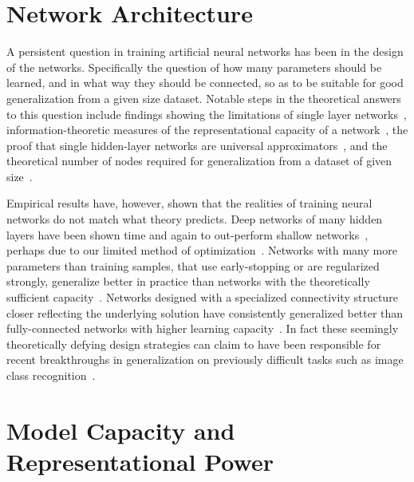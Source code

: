 \documentclass[thesis]{subfiles}
\begin{document}
	\section{Network Architecture}
    A persistent question in training artificial neural networks has been in the design of the networks. Specifically the question of how many parameters should be learned, and in what way they should be connected,  so as to be suitable for good generalization from a given size dataset. Notable steps in the theoretical answers to this question include findings showing the limitations of single layer networks~\citep{minsky1988perceptrons}, information-theoretic measures of the representational capacity of a network~\citep{vapnik2015uniform}, the proof that single hidden-layer networks are universal approximators~\citep{hornik89a}, and the theoretical number of nodes required for generalization from a dataset of given size~\citep{baum1989size}. 
    
    Empirical results have, however, shown that the realities of training neural networks do not match what theory predicts. Deep networks of many hidden layers have been shown time and again to out-perform shallow networks~\citep{Krizhevsky2012,Simonyan2014verydeep,He2015,He2016}, perhaps due to our limited method of optimization~\citep{NIPS2014_5484}. Networks with many more parameters than training samples, that use early-stopping or are regularized strongly, generalize better in practice than networks with the theoretically sufficient capacity~\citep{caruana2001overfitting, Krizhevsky2012, HintonTalk2015}. Networks designed with a specialized connectivity structure closer reflecting the underlying solution have consistently generalized better than fully-connected networks with higher learning capacity~\citep{lecun1989backpropagation,He2016}. In fact these seemingly theoretically defying design strategies can claim to have been responsible for recent breakthroughs in generalization on previously difficult tasks such as image class recognition~\citep{Krizhevsky2012, HintonTalk2015}.
    
    \section{Model Capacity and Representational Power}
    
\end{document}
